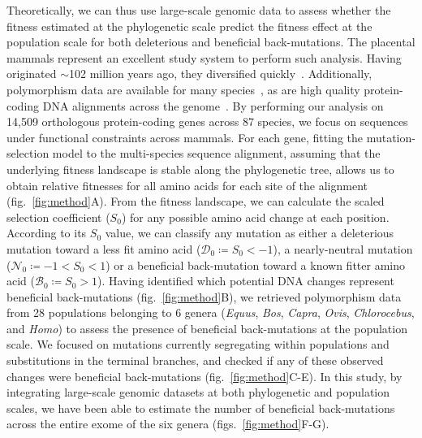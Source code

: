 \documentclass{article}
\newcommand{\Sphy}{S_{0}}
\newcommand{\SphyDel}{\mathcal{D}_0}
\newcommand{\SphyNeu}{\mathcal{N}_0}
\newcommand{\SphyBen}{\mathcal{B}_0}
\begin{document}
    Theoretically, we can thus use large-scale genomic data to assess whether the fitness estimated at the phylogenetic scale predict the fitness effect at the population scale for both deleterious and beneficial back-mutations.
    The placental mammals represent an excellent study system to perform such analysis.
    Having originated $\sim$102 million years ago, they diversified quickly~\cite{foley_genomic_2023}.
    Additionally, polymorphism data are available for many species~\cite{howe_ensembl_2021}, as are high quality protein-coding DNA alignments across the genome~\cite{ranwez_orthomam_2007, scornavacca_orthomam_2019}.
    By performing our analysis on 14,509 orthologous protein-coding genes across 87 species, we focus on sequences under functional constraints across mammals.
    For each gene, fitting the mutation-selection model to the multi-species sequence alignment, assuming that the underlying fitness landscape is stable along the phylogenetic tree, allows us to obtain relative fitnesses for all amino acids for each site of the alignment (fig.~\ref{fig:method}A).
    From the fitness landscape, we can calculate the scaled selection coefficient ($\Sphy$) for any possible amino acid change at each position.
    According to its $\Sphy$ value, we can classify any mutation as either a deleterious mutation toward a less fit amino acid ($\SphyDel \coloneqq \Sphy < -1$), a nearly-neutral mutation ($\SphyNeu \coloneqq -1 < \Sphy <1$) or a beneficial back-mutation toward a known fitter amino acid ($\SphyBen \coloneqq \Sphy > 1$).
    Having identified which potential DNA changes represent beneficial back-mutations (fig.~\ref{fig:method}B), we retrieved polymorphism data from 28 populations belonging to 6 genera (\textit{Equus}, \textit{Bos}, \textit{Capra}, \textit{Ovis}, \textit{Chlorocebus}, and \textit{Homo}) to assess the presence of beneficial back-mutations at the population scale.
    We focused on mutations currently segregating within populations and substitutions in the terminal branches, and checked if any of these observed changes were beneficial back-mutations (fig.~\ref{fig:method}C-E).
    In this study, by integrating large-scale genomic datasets at both phylogenetic and population scales, we have been able to estimate the number of beneficial back-mutations across the entire exome of the six genera (figs.~\ref{fig:method}F-G).
\end{document}
